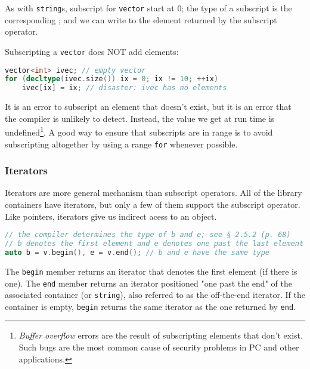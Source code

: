As with \texttt{string}s, subscript for \texttt{vector} start at 0; the type of a subscript is the corresponding ; and we can write to the element returned by the subscript operator.

Subscripting a \texttt{vector} does NOT add elements:
\begin{lstlisting}[language=C++]
vector<int> ivec; // empty vector 
for (decltype(ivec.size()) ix = 0; ix != 10; ++ix) 
    ivec[ix] = ix; // disaster: ivec has no elements
\end{lstlisting}
It is an error to subscript an element that doesn’t exist, but it is an error that the compiler is unlikely to detect. Instead, the value we get at run time is undefined\footnote{\textit{Buffer overflow} errors are the result of subscripting elements that don’t exist. Such bugs are the most common cause of security problems in PC and other applications.}. A good way to ensure that subscripts are in range is to avoid subscripting altogether by using a range \texttt{for} whenever possible.

\subsubsection{Iterators}

Iterators are more general mechanism than subscript operators. All of the library containers have iterators, but only a few of them support the subscript operator. Like pointers, iterators give us indirect acess to an object. 
\begin{lstlisting}[language=C++]
// the compiler determines the type of b and e; see § 2.5.2 (p. 68) 
// b denotes the first element and e denotes one past the last element in v 
auto b = v.begin(), e = v.end(); // b and e have the same type
\end{lstlisting}
The \texttt{begin} member returns an iterator that denotes the first element (if there is one). The \texttt{end} member returns an iterator positioned "one past the end" of the associated container (or \texttt{string}), also referred to as the off-the-end iterator. If the container is empty, \texttt{begin} returns the same iterator as the one returned by \texttt{end}.



